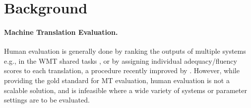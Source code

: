 \documentclass[11pt]{article}
\newcommand{\secref}[1]{Section~\ref{#1}}
\begin{document}
\section{Background}\label{sec:background}





\paragraph{Machine Translation Evaluation.}
Human evaluation is generally done by ranking the outputs of multiple systems
e.g., in the WMT shared tasks \cite{bojar2015findings}, or by assigning
individual adequacy/fluency scores to each translation, a procedure recently improved
by .
However, while providing the gold standard for MT evaluation, human evaluation is not a scalable solution,
and is infeasible where a wide variety of systems or parameter settings are to be evaluated.
\end{document}
